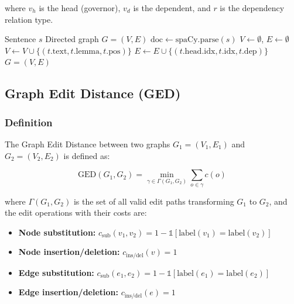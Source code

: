 \documentclass[11pt,a4paper]{article}
\begin{document}
where $v_h$ is the head (governor), $v_d$ is the dependent, and $r$ is the dependency relation type.

\begin{algorithm}[H]
\caption{Dependency Graph Construction}
\begin{algorithmic}[1]
\Require Sentence $s$
\Ensure Directed graph $G = (V, E)$
\State $\text{doc} \gets \text{spaCy.parse}(s)$
\State $V \gets \emptyset$, $E \gets \emptyset$
    \State $V \gets V \cup \{(t.\text{text}, t.\text{lemma}, t.\text{pos})\}$
        \State $E \gets E \cup \{(t.\text{head}.\text{idx}, t.\text{idx}, t.\text{dep})\}$
    \EndIf
\EndFor
\State \Return $G = (V, E)$
\end{algorithmic}
\end{algorithm}

\subsection{Graph Edit Distance (GED)}

\subsubsection{Definition}

The Graph Edit Distance between two graphs $G_1 = (V_1, E_1)$ and $G_2 = (V_2, E_2)$ is defined as:

\begin{equation}
\text{GED}(G_1, G_2) = \min_{\gamma \in \Gamma(G_1, G_2)} \sum_{o \in \gamma} c(o)
\end{equation}

where $\Gamma(G_1, G_2)$ is the set of all valid edit paths transforming $G_1$ to $G_2$, and the edit operations with their costs are:

\begin{itemize}
    \item \textbf{Node substitution:} $c_{\text{sub}}(v_1, v_2) = 1 - \mathbb{1}[\text{label}(v_1) = \text{label}(v_2)]$
    \item \textbf{Node insertion/deletion:} $c_{\text{ins/del}}(v) = 1$
    \item \textbf{Edge substitution:} $c_{\text{sub}}(e_1, e_2) = 1 - \mathbb{1}[\text{label}(e_1) = \text{label}(e_2)]$
    \item \textbf{Edge insertion/deletion:} $c_{\text{ins/del}}(e) = 1$
\end{itemize}
\end{document}
